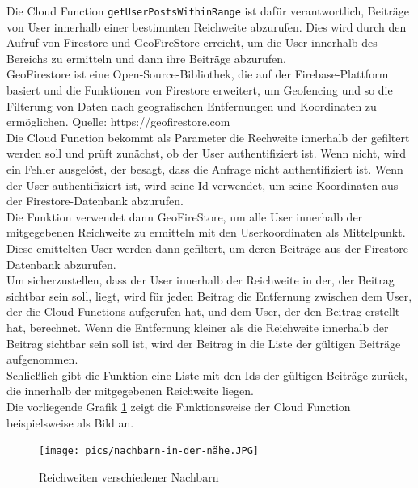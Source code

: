 Die Cloud Function \texttt{getUserPostsWithinRange} ist dafür verantwortlich, Beiträge von User innerhalb einer bestimmten Reichweite abzurufen. Dies wird durch den Aufruf von Firestore und GeoFireStore erreicht, um die User innerhalb des Bereichs zu ermitteln und dann ihre Beiträge abzurufen.
\\
GeoFirestore ist eine Open-Source-Bibliothek, die auf der Firebase-Plattform basiert und die Funktionen von Firestore erweitert, um Geofencing und so die Filterung von Daten nach geografischen Entfernungen und Koordinaten zu ermöglichen.
Quelle: https://geofirestore.com
\\
Die Cloud Function bekommt als Parameter die Rechweite innerhalb der gefiltert werden soll und prüft zunächst, ob der User authentifiziert ist. Wenn nicht, wird ein Fehler ausgelöst, der besagt, dass die Anfrage nicht authentifiziert ist. Wenn der User authentifiziert ist, wird seine Id verwendet, um seine Koordinaten aus der Firestore-Datenbank abzurufen.
\\
Die Funktion verwendet dann GeoFireStore, um alle User innerhalb der mitgegebenen Reichweite zu ermitteln mit den Userkoordinaten als Mittelpunkt. Diese emittelten User werden dann gefiltert, um deren Beiträge aus der Firestore-Datenbank abzurufen.
\\
Um sicherzustellen, dass der User innerhalb der Reichweite in der, der Beitrag sichtbar sein soll, liegt, wird für jeden Beitrag die Entfernung zwischen dem User, der die Cloud Functions aufgerufen hat, und dem User, der den Beitrag erstellt hat, berechnet. Wenn die Entfernung kleiner als die Reichweite innerhalb der Beitrag sichtbar sein soll ist, wird der Beitrag in die Liste der gültigen Beiträge aufgenommen.
\\
Schließlich gibt die Funktion eine Liste mit den Ids der gültigen Beiträge zurück, die innerhalb der mitgegebenen Reichweite liegen.
\\
Die vorliegende Grafik \ref{fig:near-neighbours} zeigt die Funktionsweise der Cloud Function beispielsweise als Bild an.

\begin{figure}[h]
  \centering
  \texttt{[image: pics/nachbarn-in-der-nähe.JPG]}
  \caption{Reichweiten verschiedener Nachbarn}
  \label{fig:near-neighbours}
\end{figure}

